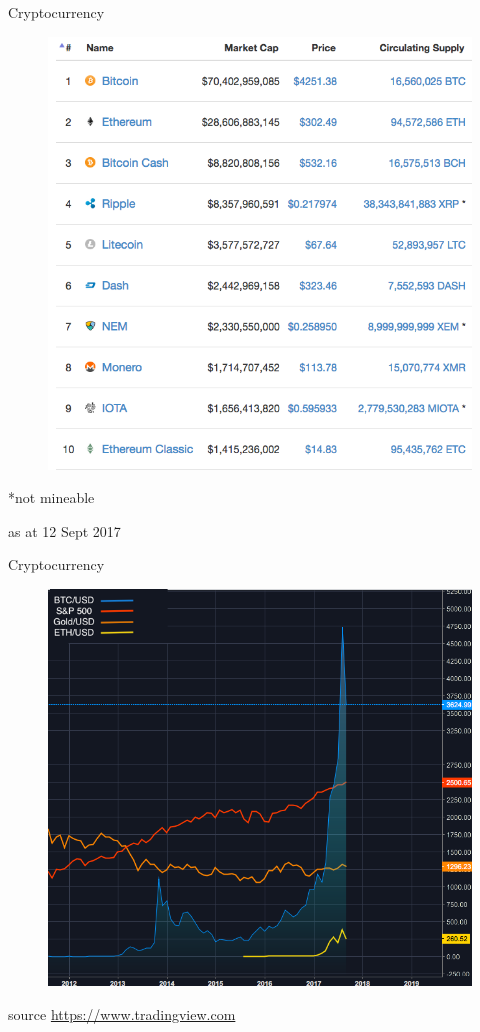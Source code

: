 \documentclass[9pt]{beamer}
\begin{document}

\begin{frame}{Cryptocurrency}
	\begin{figure}[]
		\centering
		\includegraphics  [scale=0.3]{Images/markcap}
	\end{figure}
	*not mineable\\
	\begin{tiny}
		as at 12 Sept 2017
	\end{tiny}
\end{frame}



\begin{frame}{Cryptocurrency}
	\begin{figure}[]
		\centering
		\includegraphics  [width=3.in]{Images/price}
	\end{figure}
	\begin{scriptsize}
		source \href{https://www.tradingview.com}{https://www.tradingview.com}
	\end{scriptsize}
\end{frame}
\end{document}
